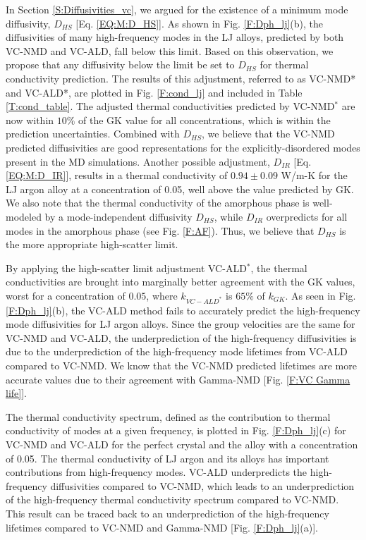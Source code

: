 In Section \ref{S:Diffusivities_vc}, 
we argued for the existence of a minimum mode 
diffusivity, $D_{HS}$ [Eq. \eqref{EQ:M:D_HS}]. 
As shown in Fig. \ref{F:Dph_lj}(b), the diffusivities of 
many high-frequency modes in the LJ alloys, predicted by both VC-NMD 
and VC-ALD, fall below this limit.  Based on this observation, we propose 
that any diffusivity below the limit be set to $D_{HS}$ 
for thermal conductivity prediction. 
The results of this adjustment, 
referred to as VC-NMD* and VC-ALD*, are plotted in Fig. \ref{F:cond_lj} 
and included in Table \ref{T:cond_table}.  
The adjusted thermal conductivities predicted by VC-NMD$^*$ are now  
within $10\%$ of the GK value for all concentrations, which
is within the prediction uncertainties. 
Combined with $D_{HS}$, we believe that the VC-NMD predicted 
diffusivities are good representations for the explicitly-disordered 
modes present in the MD simulations. Another possible 
adjustment, $D_{IR}$ [Eq. \eqref{EQ:M:D_IR}], results in a thermal 
conductivity of $0.94 \pm 0.09$ W/m-K for the LJ argon alloy at a 
concentration of 0.05, well above the value predicted by GK. 
We also note that the thermal 
conductivity of the amorphous phase is well-modeled by a mode-independent 
diffusivity $D_{HS}$, while $D_{IR}$ overpredicts for all modes in the 
amorphous phase (see Fig. \ref{F:AF}). 
Thus, we believe that $D_{HS}$ is the more appropriate high-scatter limit. 

By applying the high-scatter limit adjustment VC-ALD$^*$, the thermal 
conductivities are brought into marginally better agreement with 
the GK values, worst for a concentration of $0.05$, where 
$k_{VC-ALD^*}$ is $65\%$ of $ k_{GK}$.  
As seen in Fig. \ref{F:Dph_lj}(b), the VC-ALD method fails to 
accurately predict the high-frequency mode diffusivities for 
LJ argon alloys. Since the group velocities are the same for 
VC-NMD and VC-ALD, the underprediction of the high-frequency 
diffusivities is
due to the underprediction of the high-frequency 
mode lifetimes from VC-ALD compared to VC-NMD. We know that the 
VC-NMD predicted lifetimes are more accurate values due 
to their agreement with Gamma-NMD [Fig. \ref{F:VC Gamma life}]. 

The thermal conductivity spectrum, defined as 
the contribution to thermal conductivity of modes at a given frequency, 
is plotted in Fig. \ref{F:Dph_lj}(c) for VC-NMD and VC-ALD for the 
perfect crystal and the alloy with a concentration of 0.05. The thermal 
conductivity of LJ argon and its alloys has important 
contributions from high-frequency modes. 
VC-ALD underpredicts the high-frequency 
diffusivities compared to VC-NMD, which leads to an 
underprediction of the high-frequency thermal conductivity spectrum 
compared to VC-NMD. This result can be traced back to an underprediction 
of the high-frequency lifetimes compared to VC-NMD and Gamma-NMD 
[Fig. \ref{F:Dph_lj}(a)]. 

